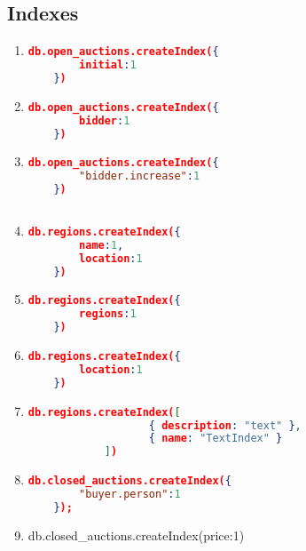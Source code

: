\subsection{Indexes}
\begin{enumerate}[label=I\arabic*.]
\item \label{mongodb-i-1}
\begin{lstlisting}[language=JSON,  basicstyle=\scriptsize]
   db.open_auctions.createIndex({
		initial:1
	})
\end{lstlisting}

\item \label{mongodb-i-2}
\begin{lstlisting}[language=JSON,  basicstyle=\scriptsize]
  	db.open_auctions.createIndex({
		bidder:1
	})
\end{lstlisting}

\item \label{mongodb-i-3}
\begin{lstlisting}[language=JSON]
  	db.open_auctions.createIndex({
		"bidder.increase":1
	})
	
\end{lstlisting}

\item \label{mongodb-i-4}
\begin{lstlisting}[language=JSON]
  	db.regions.createIndex({
		name:1,
		location:1
	})
\end{lstlisting}

\item \label{mongodb-i-5}
\begin{lstlisting}[language=JSON]
  db.regions.createIndex({
		regions:1
	})

\end{lstlisting}


\item \label{mongodb-i-6}
\begin{lstlisting}[language=JSON]
  	db.regions.createIndex({
		location:1
	})
\end{lstlisting}


\item \label{mongodb-i-7}
\begin{lstlisting}[language=JSON]
  	db.regions.createIndex([
                   { description: "text" },
                   { name: "TextIndex" }
            ])

\end{lstlisting}


\item \label{mongodb-i-8}
\begin{lstlisting}[language=JSON]
   	db.closed_auctions.createIndex({
		"buyer.person":1
	});
\end{lstlisting}


\item \label{mongodb-i-9}
\begin{fakeJSON}
  db.closed_auctions.createIndex({price:1})
\end{fakeJSON}


\end{enumerate}
